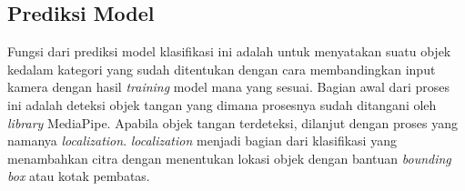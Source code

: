 
\subsection{Prediksi Model}
\label{subsec:Prediksi Model}

Fungsi dari prediksi model klasifikasi ini adalah untuk menyatakan suatu objek kedalam kategori yang sudah ditentukan dengan cara membandingkan input kamera dengan hasil \emph{training} model mana yang sesuai. Bagian awal dari proses ini adalah deteksi objek tangan yang dimana prosesnya sudah ditangani oleh \emph{library} MediaPipe. Apabila objek tangan terdeteksi, dilanjut dengan proses yang namanya \emph{localization}. \emph{localization} menjadi bagian dari klasifikasi yang menambahkan citra dengan menentukan lokasi objek dengan bantuan \emph{bounding box} atau kotak pembatas. 


